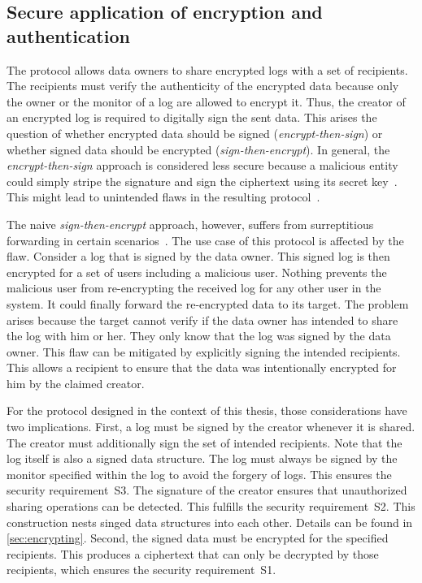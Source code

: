 \documentclass[../main.tex]{subfiles}
\begin{document}
\subsection{Secure application of encryption and authentication}
\label{sec:sign-and-encrypt}
The protocol allows data owners to share encrypted logs with a set of recipients.
The recipients must verify the authenticity of the encrypted data because only the owner or the monitor of a log are allowed to encrypt it.
Thus, the creator of an encrypted log is required to digitally sign the sent data.
This arises the question of whether encrypted data should be signed (\emph{encrypt-then-sign}) or whether signed data should be encrypted (\emph{sign-then-encrypt}).
In general, the \emph{encrypt-then-sign} approach is considered less secure because a malicious entity could simply stripe the signature and sign the ciphertext using its secret key~\cite{Davis2001}.
This might lead to unintended flaws in the resulting protocol~\cite{JWT2015}.

The naive \emph{sign-then-encrypt} approach, however, suffers from surreptitious forwarding in certain scenarios~\cite{Davis2001}.
The use case of this protocol is affected by the flaw.
Consider a log that is signed by the data owner.
This signed log is then encrypted for a set of users including a malicious user.
Nothing prevents the malicious user from re-encrypting the received log for any other user in the system.
It could finally forward the re-encrypted data to its target.
The problem arises because the target cannot verify if the data owner has intended to share the log with him or her.
They only know that the log was signed by the data owner.
This flaw can be mitigated by explicitly signing the intended recipients.
This allows a recipient to ensure that the data was intentionally encrypted for him by the claimed creator.~\cite{Davis2001}

For the protocol designed in the context of this thesis, those considerations have two implications.
First, a log must be signed by the creator whenever it is shared.
The creator must additionally sign the set of intended recipients.
Note that the log itself is also a signed data structure.
The log must always be signed by the monitor specified within the log to avoid the forgery of logs.
This ensures the security requirement~S3.
The signature of the creator ensures that unauthorized sharing operations can be detected.
This fulfills the security requirement~S2.
This construction nests singed data structures into each other.
Details can be found in \cref{sec:encrypting}.
Second, the signed data must be encrypted for the specified recipients.
This produces a ciphertext that can only be decrypted by those recipients, which ensures the security requirement~S1.
\end{document}
